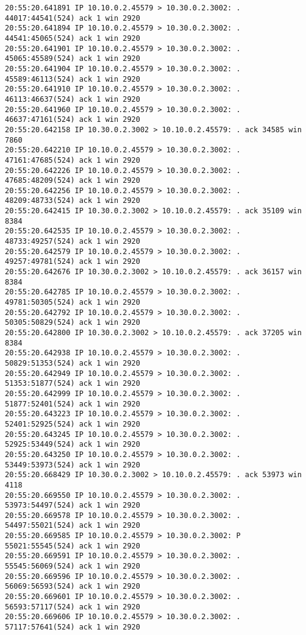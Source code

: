 \documentclass[a4paper,12pt]{article}
\begin{document}
\begin{Verbatim}
20:55:20.641891 IP 10.10.0.2.45579 > 10.30.0.2.3002: . 44017:44541(524) ack 1 win 2920
20:55:20.641894 IP 10.10.0.2.45579 > 10.30.0.2.3002: . 44541:45065(524) ack 1 win 2920
20:55:20.641901 IP 10.10.0.2.45579 > 10.30.0.2.3002: . 45065:45589(524) ack 1 win 2920
20:55:20.641904 IP 10.10.0.2.45579 > 10.30.0.2.3002: . 45589:46113(524) ack 1 win 2920
20:55:20.641910 IP 10.10.0.2.45579 > 10.30.0.2.3002: . 46113:46637(524) ack 1 win 2920
20:55:20.641960 IP 10.10.0.2.45579 > 10.30.0.2.3002: . 46637:47161(524) ack 1 win 2920
20:55:20.642158 IP 10.30.0.2.3002 > 10.10.0.2.45579: . ack 34585 win 7860
20:55:20.642210 IP 10.10.0.2.45579 > 10.30.0.2.3002: . 47161:47685(524) ack 1 win 2920
20:55:20.642226 IP 10.10.0.2.45579 > 10.30.0.2.3002: . 47685:48209(524) ack 1 win 2920
20:55:20.642256 IP 10.10.0.2.45579 > 10.30.0.2.3002: . 48209:48733(524) ack 1 win 2920
20:55:20.642415 IP 10.30.0.2.3002 > 10.10.0.2.45579: . ack 35109 win 8384
20:55:20.642535 IP 10.10.0.2.45579 > 10.30.0.2.3002: . 48733:49257(524) ack 1 win 2920
20:55:20.642579 IP 10.10.0.2.45579 > 10.30.0.2.3002: . 49257:49781(524) ack 1 win 2920
20:55:20.642676 IP 10.30.0.2.3002 > 10.10.0.2.45579: . ack 36157 win 8384
20:55:20.642785 IP 10.10.0.2.45579 > 10.30.0.2.3002: . 49781:50305(524) ack 1 win 2920
20:55:20.642792 IP 10.10.0.2.45579 > 10.30.0.2.3002: . 50305:50829(524) ack 1 win 2920
20:55:20.642800 IP 10.30.0.2.3002 > 10.10.0.2.45579: . ack 37205 win 8384
20:55:20.642938 IP 10.10.0.2.45579 > 10.30.0.2.3002: . 50829:51353(524) ack 1 win 2920
20:55:20.642949 IP 10.10.0.2.45579 > 10.30.0.2.3002: . 51353:51877(524) ack 1 win 2920
20:55:20.642999 IP 10.10.0.2.45579 > 10.30.0.2.3002: . 51877:52401(524) ack 1 win 2920
20:55:20.643223 IP 10.10.0.2.45579 > 10.30.0.2.3002: . 52401:52925(524) ack 1 win 2920
20:55:20.643245 IP 10.10.0.2.45579 > 10.30.0.2.3002: . 52925:53449(524) ack 1 win 2920
20:55:20.643250 IP 10.10.0.2.45579 > 10.30.0.2.3002: . 53449:53973(524) ack 1 win 2920
20:55:20.668429 IP 10.30.0.2.3002 > 10.10.0.2.45579: . ack 53973 win 4118
20:55:20.669550 IP 10.10.0.2.45579 > 10.30.0.2.3002: . 53973:54497(524) ack 1 win 2920
20:55:20.669578 IP 10.10.0.2.45579 > 10.30.0.2.3002: . 54497:55021(524) ack 1 win 2920
20:55:20.669585 IP 10.10.0.2.45579 > 10.30.0.2.3002: P 55021:55545(524) ack 1 win 2920
20:55:20.669591 IP 10.10.0.2.45579 > 10.30.0.2.3002: . 55545:56069(524) ack 1 win 2920
20:55:20.669596 IP 10.10.0.2.45579 > 10.30.0.2.3002: . 56069:56593(524) ack 1 win 2920
20:55:20.669601 IP 10.10.0.2.45579 > 10.30.0.2.3002: . 56593:57117(524) ack 1 win 2920
20:55:20.669606 IP 10.10.0.2.45579 > 10.30.0.2.3002: . 57117:57641(524) ack 1 win 2920

\end{Verbatim}
\end{document}
